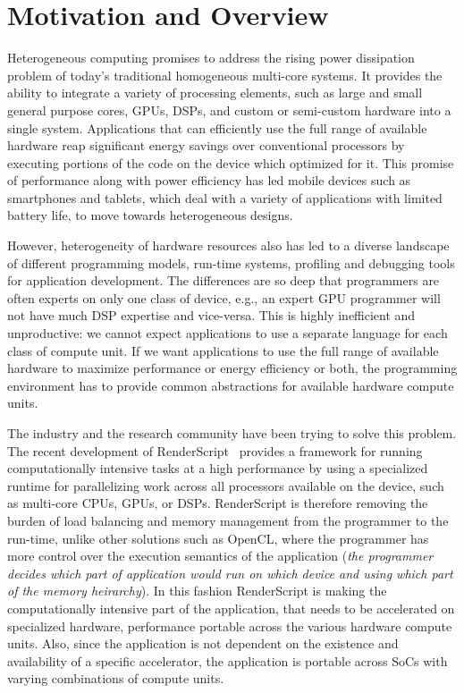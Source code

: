 \section{Motivation and Overview}
Heterogeneous computing promises to address the rising power dissipation problem
of today's traditional homogeneous multi-core
systems. It provides the ability to integrate a variety of processing elements,
such as large and small general purpose cores, GPUs, DSPs, and custom or
semi-custom hardware into a single system. Applications that can efficiently use
the full range of available hardware reap significant energy
savings over conventional processors by executing portions of the code on the
device which optimized for it. This promise of performance along with power efficiency
has led mobile devices such as smartphones
and tablets, which deal with a variety of applications with limited battery
life, to move towards heterogeneous designs.

However, heterogeneity of hardware resources also has led to a diverse landscape
of different programming models, run-time systems, profiling and debugging tools
for application development. The differences are so deep that programmers are
often experts on only one class of device, e.g., an expert GPU programmer will
not have much DSP expertise and vice-versa. This is highly inefficient and
unproductive: we cannot expect applications to use a separate language for each
class of compute unit. If we want applications to use the full range of
available hardware to maximize performance or energy efficiency or both, the
programming environment has to provide common abstractions for available
hardware compute units.

The industry and the research community have been trying to solve this problem.
The recent development of RenderScript~\cite{wiki:RenderScript, RenderScript} provides a framework
for running computationally intensive tasks at a high performance by using a
specialized runtime for 
parallelizing work across all processors available on the device, such as
multi-core CPUs, GPUs, or DSPs. RenderScript is therefore removing the
burden of load balancing and memory management from the programmer to the run-time, unlike other
solutions such as OpenCL, where the programmer has more control over the
execution semantics of the application ({\em the programmer decides which part
of application would run on which device and using which part of the memory heirarchy}).
In this fashion RenderScript is
making the computationally intensive part of the application, that needs to be
accelerated on specialized hardware, performance portable across the various hardware compute
units. Also, since the application is not dependent on the existence and
availability of a specific accelerator, the application is portable across SoCs
with varying combinations of compute units.


